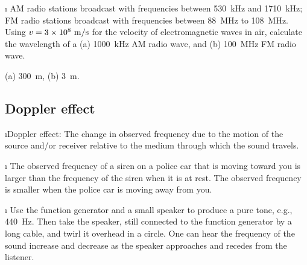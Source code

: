 \i \exer
AM radio stations broadcast with frequencies between 530~kHz and 1710~kHz;
FM radio stations broadcast with frequencies between 88~MHz to 108~MHz.
Using $v=3\times 10^8~{\rm m/s}$ for the velocity of 
electromagnetic waves in air, calculate the wavelength of a
(a) 1000~kHz AM radio wave, and 
(b) 100~MHz FM radio wave.

\ans
(a) 300~m, (b) 3~m.

\ei
\subsection{Doppler effect}
\bi

\i Doppler effect:
The change in observed frequency due to the
motion of the source and/or receiver relative
to the medium through which the sound travels.

\i \ex 
The observed frequency of a siren on a police car 
that is moving toward you is larger than the 
frequency of the siren when it is at rest.
The observed frequency is smaller when the police 
car is moving away from you.

\i \demo
Use the function generator and a small speaker to
produce a pure tone, e.g., 440~Hz.
Then take the speaker, still connected to the
function generator by a long cable, and twirl it
overhead in a circle.
One can hear the frequency of the sound increase 
and decrease as the speaker approaches and recedes 
from the listener.

\ei

